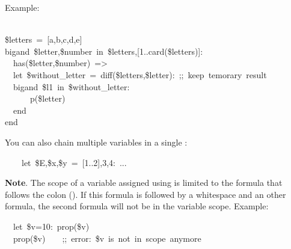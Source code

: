 Example:%
\begin{mdpre}%
\\
{\$letters}~=~{}[a,b,c,d,e]\\
{bigand}~{\$letter},{\$number}~{in}~{\$letters},{}[{1}..{card}({\$letters})]:\\
~~has({\$letter},{\$number})~=\textgreater{}\\
~~{let}~{\$without\_letter}~=~{diff}({\$letters},{\$letter}):~{;;~keep~temorary~result}\\
~~{bigand}~{\$l1}~{in}~{\$without\_letter}:\\
~~~~~~p({\$letter})\\
~~{end}\\
{end}%
\end{mdpre}\noindent You can also chain multiple variables in a single :
\begin{mdpre}%
\noindent~~~~{let}~{\$E},{\$x},{\$y}~=~{}[{1}..{2}],{3},{4}:~...%
\end{mdpre}
\noindent\textbf{Note}.
The scope of a variable assigned using  is limited to the formula
that follows the colon (\mdcode{:}). If this formula is followed by a whitespace
and an other formula, the second formula will not be in the variable
scope. Example:%
\begin{mdpre}%
\noindent~~{let}~{\$v}={10}:~prop({\$v})\\
~~prop({\$v})~~~~{;;~error:~\$v~is~not~in~scope~anymore}%
\end{mdpre}%

